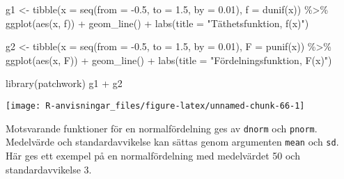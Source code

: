 \documentclass[
]{book}
\newenvironment{Shaded}{\begin{snugshade}}{\end{snugshade}}
\newcommand{\AttributeTok}[1]{\textcolor[rgb]{0.77,0.63,0.00}{#1}}
\newcommand{\FloatTok}[1]{\textcolor[rgb]{0.00,0.00,0.81}{#1}}
\newcommand{\FunctionTok}[1]{\textcolor[rgb]{0.00,0.00,0.00}{#1}}
\newcommand{\NormalTok}[1]{#1}
\newcommand{\OtherTok}[1]{\textcolor[rgb]{0.56,0.35,0.01}{#1}}
\newcommand{\SpecialCharTok}[1]{\textcolor[rgb]{0.00,0.00,0.00}{#1}}
\newcommand{\StringTok}[1]{\textcolor[rgb]{0.31,0.60,0.02}{#1}}
\theoremstyle{definition}
\theoremstyle{definition}
\theoremstyle{definition}
\theoremstyle{definition}
\theoremstyle{remark}
\begin{document}
\begin{Shaded}
\begin{Highlighting}[]
\NormalTok{g1 }\OtherTok{\textless{}{-}} \FunctionTok{tibble}\NormalTok{(}\AttributeTok{x =} \FunctionTok{seq}\NormalTok{(}\AttributeTok{from =} \SpecialCharTok{{-}}\FloatTok{0.5}\NormalTok{, }\AttributeTok{to =} \FloatTok{1.5}\NormalTok{, }\AttributeTok{by =} \FloatTok{0.01}\NormalTok{),}
             \AttributeTok{f =} \FunctionTok{dunif}\NormalTok{(x)) }\SpecialCharTok{\%\textgreater{}\%} 
  \FunctionTok{ggplot}\NormalTok{(}\FunctionTok{aes}\NormalTok{(x, f)) }\SpecialCharTok{+} 
  \FunctionTok{geom\_line}\NormalTok{() }\SpecialCharTok{+}
  \FunctionTok{labs}\NormalTok{(}\AttributeTok{title =} \StringTok{"Täthetsfunktion, f(x)"}\NormalTok{)}

\NormalTok{g2 }\OtherTok{\textless{}{-}} \FunctionTok{tibble}\NormalTok{(}\AttributeTok{x =} \FunctionTok{seq}\NormalTok{(}\AttributeTok{from =} \SpecialCharTok{{-}}\FloatTok{0.5}\NormalTok{, }\AttributeTok{to =} \FloatTok{1.5}\NormalTok{, }\AttributeTok{by =} \FloatTok{0.01}\NormalTok{),}
             \AttributeTok{F =} \FunctionTok{punif}\NormalTok{(x)) }\SpecialCharTok{\%\textgreater{}\%} 
  \FunctionTok{ggplot}\NormalTok{(}\FunctionTok{aes}\NormalTok{(x, F)) }\SpecialCharTok{+} 
  \FunctionTok{geom\_line}\NormalTok{() }\SpecialCharTok{+}
  \FunctionTok{labs}\NormalTok{(}\AttributeTok{title =} \StringTok{"Fördelningsfunktion, F(x)"}\NormalTok{)}

\FunctionTok{library}\NormalTok{(patchwork)}
\NormalTok{g1 }\SpecialCharTok{+}\NormalTok{ g2}
\end{Highlighting}
\end{Shaded}

\begin{center}\texttt{[image: R-anvisningar\_files/figure-latex/unnamed-chunk-66-1]} \end{center}

Motsvarande funktioner för en normalfördelning ges av \texttt{dnorm} och \texttt{pnorm}. Medelvärde och standardavvikelse kan sättas genom argumenten \texttt{mean} och \texttt{sd}. Här ges ett exempel på en normalfördelning med medelvärdet 50 och standardavvikelse 3.
\end{document}
